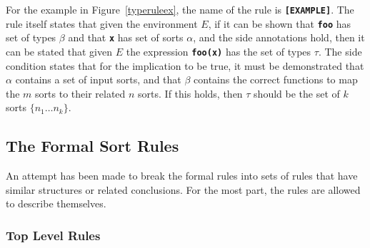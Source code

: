 \documentclass[12pt]{article} %
\newcommand{\reserved}[1]{\textbf{\texttt{#1}}} %
\begin{document}
For the example in Figure~\ref{typeruleex}, the name of the rule is
\reserved{[EXAMPLE]}. The rule itself states that given the
environment $E$, if it can be shown that \reserved{foo} has set of types
$\beta$ and that \reserved{x} has set of sorts $\alpha$, and the side
annotations hold, then it can be
stated that given $E$ the expression \reserved{foo(x)} has the set of 
types $\tau$. The side condition states that for the implication to be
true, it must be demonstrated that $\alpha$ contains a set of input sorts,
and that $\beta$ contains the correct functions to map the $m$ sorts to
their related $n$ sorts. If this holds, then $\tau$ should be the set
of $k$ sorts $\{n_1 \dots n_k\}$.

\subsection{The Formal Sort Rules}
An attempt has been made to break the formal rules into sets of rules
that have similar structures or related conclusions. For the most
part, the rules are allowed to describe themselves.



\subsubsection{Top Level Rules}
\label{toprules}
\end{document}

